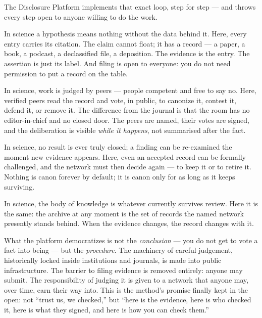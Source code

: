 \documentclass[11pt,a4paper]{article}
\begin{document}
The Disclosure Platform implements that exact loop, step for step --- and
throws every step open to anyone willing to do the work.

\begin{description}[leftmargin=1.2em,style=nextline]
  \item[\textnormal{\textbf{1. A claim, filed against a source.}}]
  In science a hypothesis means nothing without the data behind it. Here,
  every entry carries its citation. The claim cannot float; it has a record
  --- a paper, a book, a podcast, a declassified file, a deposition. The
  evidence is the entry. The assertion is just its label. And filing is
  open to everyone: you do not need permission to put a record on the table.

  \item[\textnormal{\textbf{2. Open peer review.}}]
  In science, work is judged by peers --- people competent and free to say
  no. Here, verified peers read the record and vote, in public, to canonize
  it, contest it, defend it, or remove it. The difference from the journal
  is that the room has no editor-in-chief and no closed door. The peers are
  named, their votes are signed, and the deliberation is visible \emph{while
  it happens}, not summarised after the fact.

  \item[\textnormal{\textbf{3. Challenge and replication.}}]
  In science, no result is ever truly closed; a finding can be re-examined
  the moment new evidence appears. Here, even an accepted record can be
  formally challenged, and the network must then decide again --- to keep it
  or to retire it. Nothing is canon forever by default; it is canon only for
  as long as it keeps surviving.

  \item[\textnormal{\textbf{4. Revision.}}]
  In science, the body of knowledge is whatever currently survives review.
  Here it is the same: the archive at any moment is the set of records the
  named network presently stands behind. When the evidence changes, the
  record changes with it.
\end{description}

What the platform democratizes is not the \emph{conclusion} --- you do not
get to vote a fact into being --- but the \emph{procedure}. The machinery of
careful judgement, historically locked inside institutions and journals, is
made into public infrastructure. The barrier to filing evidence is removed
entirely: anyone may submit. The responsibility of judging it is given to a
network that anyone may, over time, earn their way into. This is the
method's promise finally kept in the open: not ``trust us, we checked,''
but ``here is the evidence, here is who checked it, here is what they
signed, and here is how you can check them.''
\end{document}
